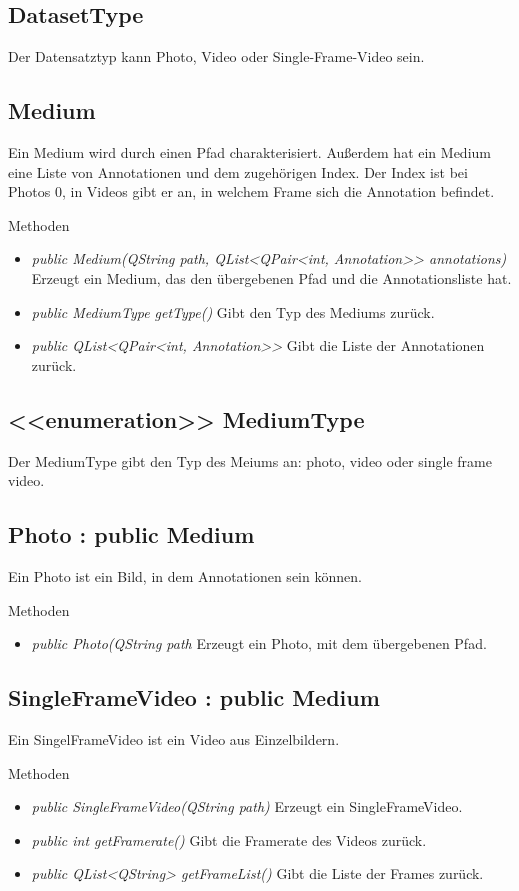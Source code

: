 \subsection*{DatasetType}
Der Datensatztyp kann Photo, Video oder Single-Frame-Video sein.

\subsection*{Medium}
Ein Medium wird durch einen Pfad charakterisiert. Außerdem hat ein Medium eine Liste von Annotationen und dem zugehörigen Index. Der Index ist bei Photos 0, in Videos gibt er an, in welchem Frame sich die Annotation befindet.

Methoden
\begin{itemize}
\item \textit{public Medium(QString path, QList<QPair<int, Annotation>> annotations)} Erzeugt ein Medium, das den übergebenen Pfad und die Annotationsliste hat.
\item \textit{public MediumType getType()} Gibt den Typ des Mediums zurück.
\item \textit{public QList<QPair<int, Annotation>>} Gibt die Liste der Annotationen zurück.
\end{itemize}

\subsection*{<<enumeration>> MediumType}
Der MediumType gibt den Typ des Meiums an: photo, video oder single frame video.

\subsection*{Photo : public Medium}
Ein Photo ist ein Bild, in dem Annotationen sein können.

Methoden
\begin{itemize}
\item \textit{public Photo(QString path} Erzeugt ein Photo, mit dem übergebenen Pfad.
\end{itemize}

\subsection*{SingleFrameVideo : public Medium}
Ein SingelFrameVideo ist ein Video aus Einzelbildern.

Methoden
\begin{itemize}
\item \textit{public SingleFrameVideo(QString path)} Erzeugt ein SingleFrameVideo.
\item \textit{public int getFramerate()} Gibt die Framerate des Videos zurück.
\item \textit{public QList<QString> getFrameList()} Gibt die Liste der Frames zurück.
\end{itemize}


